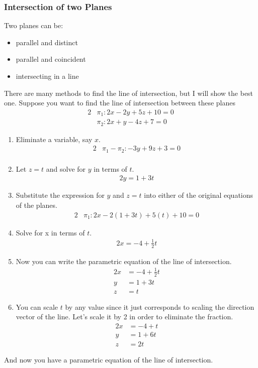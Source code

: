 \documentclass{report}
\theoremstyle{definition}
\numberwithin{equation}{section}
\begin{document}
\subsubsection{Intersection of two Planes}
Two planes can be:
\begin{itemize}
	\item parallel and distinct
	\item parallel and coincident
	\item intersecting in a line
\end{itemize}
There are many methods to find the line of intersection, but I will show the best one. Suppose you want to find the line of intersection between these planes
\begin{alignat*}{2}{}
	&\pi_1 : 2x-2y+5z+10=0 \\
	&\pi_2 : 2x+y-4z+7=0
\end{alignat*}
\begin{enumerate}
	\item Eliminate a variable, say $x$.
\begin{alignat*}{2}{}
	&\pi_1 - \pi_2: -3y+9z+3=0 \\
\end{alignat*}
	\item Let $z=t$ and solve for $y$ in terms of $t$.
\begin{alignat*}{2}{}
	y=1+3t
\end{alignat*}
	\item Substitute the expression for $y$ and $z=t$ into either of the original equations of the planes.
\begin{alignat*}{2}{}
	&\pi_1 : 2x - 2 (1+3t) + 5(t) + 10 = 0
\end{alignat*}
	\item Solve for x in terms of $t$.
\begin{alignat*}{2}{}
	x = -4 + \frac{1}{2}t
\end{alignat*}
	\item Now you can write the parametric equation of the line of intersection.
	\begin{alignat*}{2}{}
		x &= -4 + \frac{1}{2}t \\
		y &= 1 + 3t \\
		z &= t
	\end{alignat*}
	\item You can scale $t$ by any value since it just corresponds to scaling the direction vector of the line. Let's scale it by 2 in order to eliminate the fraction.
	\begin{alignat*}{2}{}
		x &= -4 + t \\
		y &= 1 + 6t \\
		z &= 2t
	\end{alignat*}
\end{enumerate}
And now you have a parametric equation of the line of intersection.
\end{document}
